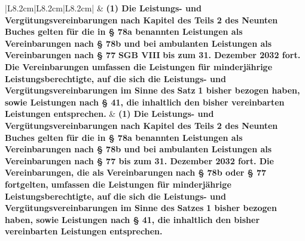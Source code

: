 \documentclass[10pt,a4paper,landscape]{article}
\begin{document}
\begin{longtable}{|L{8.2cm}|L{8.2cm}|L{8.2cm}|}
 & \textbf{(1) Die Leistungs- und  \newline Vergütungsvereinbarungen nach Kapitel   des Teils 2 des Neunten Buches  \newline gelten für die in \S{} 78a benannten  \newline Leistungen als Vereinbarungen nach \S{}  \newline 78b und bei ambulanten Leistungen als  \newline Vereinbarungen nach \S{} 77 }\textbf{\textcolor{diffred}{SGB VIII}}\textbf{ bis  \newline zum 31. Dezember 2032 fort. Die  \newline Vereinbarungen umfassen die  \newline Leistungen für minderjährige  \newline Leistungsberechtigte, auf die sich die  \newline Leistungs- und  \newline Vergütungsvereinbarungen im Sinne  \newline des }\textbf{\textcolor{diffred}{Satz}}\textbf{ 1 bisher bezogen haben, sowie  \newline Leistungen nach \S{} 41, die inhaltlich den  \newline bisher vereinbarten Leistungen  \newline entsprechen. } & \textbf{(1) Die Leistungs- und  \newline Vergütungsvereinbarungen nach Kapitel   des Teils 2 des Neunten Buches  \newline gelten für die in \S{} 78a benannten  \newline Leistungen als Vereinbarungen nach \S{}  \newline 78b und bei ambulanten Leistungen als  \newline Vereinbarungen nach \S{} 77 bis zum 31.  \newline Dezember 2032 fort. Die} \newline \textbf{\textcolor{diffgreen}{Vereinbarungen, die als}}\textbf{ Vereinbarungen} \newline \textbf{\textcolor{diffgreen}{nach \S{} 78b oder \S{} 77 fortgelten,}}\textbf{  \newline umfassen die Leistungen für  \newline minderjährige Leistungsberechtigte, auf  \newline die sich die Leistungs- und  \newline Vergütungsvereinbarungen im Sinne  \newline des }\textbf{\textcolor{diffgreen}{Satzes}}\textbf{ 1 bisher bezogen haben,  \newline sowie Leistungen nach \S{} 41, die  \newline inhaltlich den bisher vereinbarten  \newline Leistungen entsprechen. } \\

\end{longtable}
\end{document}
